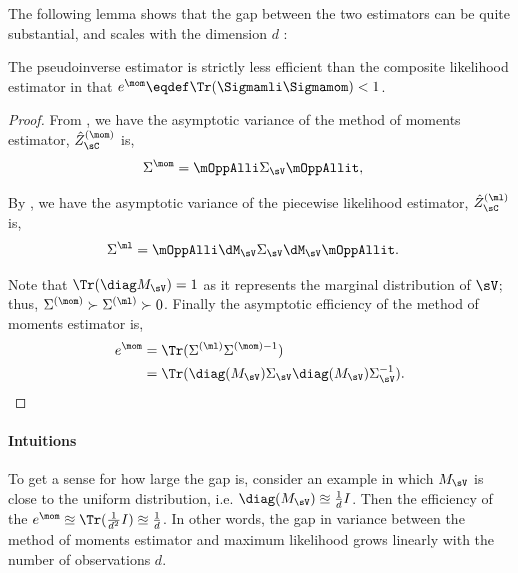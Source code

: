
The following lemma shows that the gap between the two estimators can be quite substantial,
and scales with the dimension $d$ :
\begin{corollary}
The pseudoinverse estimator is strictly less efficient
than the composite likelihood estimator in that $e^\mom \eqdef \Tr(\Sigmamli \Sigmamom) < 1$.
\end{corollary}
\begin{proof}
  From , we have the asymptotic variance of the method of moments estimator, $\hat Z_\sC^{(\mom)}$ is,
  \begin{align*}
    \Sigma^{\mom} &= \mOppAlli \Sigma_\sV \mOppAllit,
  \end{align*}

  By , we have the asymptotic variance of the piecewise likelihood estimator, $\hat Z_\sC^{(\ml)}$ is,
  \begin{align*}
    \Sigma^{\ml} &= \mOppAlli \dM_\sV \Sigma_\sV \dM_\sV \mOppAllit.
  \end{align*}

  Note that $\Tr(\diag M_\sV) = 1$ as it represents the marginal
  distribution of $\sV$; thus, $\Sigma^{(\mom)} \succ \Sigma^{(\ml)}
  \succ 0$.  Finally the asymptotic efficiency of the method of moments
  estimator is, 
  \begin{align*}
    e^\mom &= \Tr( \Sigma^{(\ml)}\Sigma^{(\mom) -1} )  \\
           &= \Tr( \diag(M_\sV) \Sigma_\sV \diag(M_\sV) \Sigma_\sV^{-1} ).
  \end{align*}
\end{proof}

\paragraph{Intuitions}
To get a sense for how large the gap is, consider an example in which
$M_\sV$ is close to the uniform distribution, i.e. $\diag(M_\sV)
  \approxeq \frac{1}{d} I$. 
Then the efficiency of the $e^\mom \approxeq \Tr(\frac{1}{d^2} I)
  \approxeq \frac{1}{d}$.
In other words, the gap in variance between the method of moments
  estimator and maximum likelihood grows linearly with the number of observations $d$.

